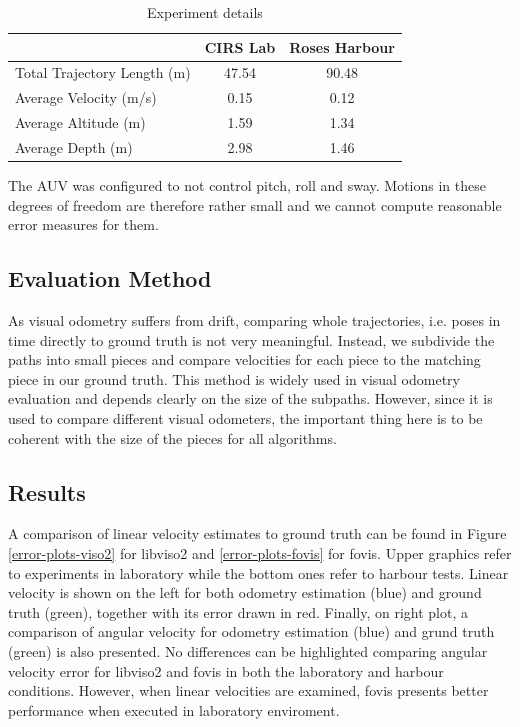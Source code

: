 \documentclass[conference]{IEEEtran}
\begin{document}
\begin{table}[!t]
  \renewcommand{\arraystretch}{1.3}
  \caption{Experiment details}
  \label{experiment-details}
  \centering
  \begin{tabular}{lcc}
    & \textbf{CIRS Lab} & \textbf{Roses Harbour}  \\ \hline
    Total Trajectory Length (m)     & 47.54 & 90.48  \\
    Average Velocity (m/s)          & 0.15 & 0.12  \\
    Average Altitude (m)            & 1.59 & 1.34  \\
    Average Depth (m)               & 2.98 & 1.46  \\
  \end{tabular}
\end{table}

The AUV was configured to not control pitch, roll and sway. Motions in these degrees of freedom are therefore rather small and we cannot compute reasonable error measures for them.

\subsection{Evaluation Method
  \label{evaluation-method}
}

As visual odometry suffers from drift, comparing whole trajectories, i.e. poses in time directly to ground truth is not very meaningful. Instead, we subdivide the paths into small pieces and compare velocities for each piece to the matching piece in our ground truth. This method is widely used in visual odometry evaluation \cite{Kitti2013} and depends clearly on the size of the subpaths. However, since it is used to compare different visual odometers, the important thing here is to be coherent with the size of the pieces for all algorithms.

\subsection{Results
  \label{results}
}

A comparison of linear velocity estimates to ground truth can be found in Figure \ref{error-plots-viso2} for libviso2 and \ref{error-plots-fovis} for fovis. Upper graphics refer to experiments in laboratory while the bottom ones refer to harbour tests. Linear velocity is shown on the left for both odometry estimation (blue) and ground truth (green), together with its error drawn in red. Finally, on right plot, a comparison of angular velocity for odometry estimation (blue) and grund truth (green) is also presented. No differences can be highlighted comparing angular velocity error for libviso2 and fovis in both the laboratory and harbour conditions. However, when linear velocities are examined, fovis presents better performance when executed in laboratory enviroment.
\end{document}

